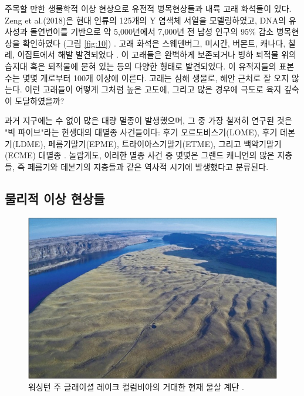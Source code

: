 \documentclass[10pt,twocolumn,letterpaper]{article}
\begin{document}
주목할 만한 생물학적 이상 현상으로 유전적 병목현상들과 내륙 고래 화석들이 있다. Zeng et al.(2018)은 현대 인류의 125개의 Y 염색체 서열을 모델링하였고, DNA의 유사성과 돌연변이를 기반으로 약 5,000년에서 7,000년 전  남성 인구의 95\% 감소 병목현상을 확인하였다 (그림 \ref{fig:10}) \cite{62}. 고래 화석은 스웨덴버그, 미시간, 버몬트, 캐나다, 칠레, 이집트에서 해발 발견되었다 \cite{63,64,65,66}. 이 고래들은 완벽하게 보존되거나  빙하 퇴적물 위의 습지대 혹은  퇴적물에 묻혀 있는 등의 다양한 형태로 발견되었다. 이 유적지들의 표본 수는 몇몇 개로부터 100개 이상에 이른다. 고래는 심해 생물로, 해안 근처로 잘 오지 않는다. 이런 고래들이 어떻게 그처럼 높은 고도에, 그리고 많은 경우에 극도로 육지 깊숙이 도달하였을까?

과거 지구에는 수 없이 많은 대량 멸종이 발생했으며, 그 중 가장 철저히 연구된 것은 "빅 파이브"라는 현생대의 대멸종 사건들이다: 후기 오르도비스기(LOME), 후기 데본기(LDME), 페름기말기(EPME), 트라이아스기말기(ETME), 그리고 백악기말기(ECME) 대멸종 \cite{88,89}. 놀랍게도, 이러한 멸종 사건 중 몇몇은 그랜드 캐니언의 많은 지층들, 즉 페름기와 데본기의  지층들과 같은 역사적 시기에 발생했다고 분류된다.

\subsection{물리적 이상 현상들}

\begin{figure}[b]
\begin{center}
   \includegraphics[width=1\linewidth]{columbia.jpg}
\end{center}
   \caption{워싱턴 주 글래이셜 레이크 컬럼비아의 거대한 현재 물살 계단 \cite{80}.}
\label{fig:11}
\label{fig:onecol}
\end{figure}
\end{document}
